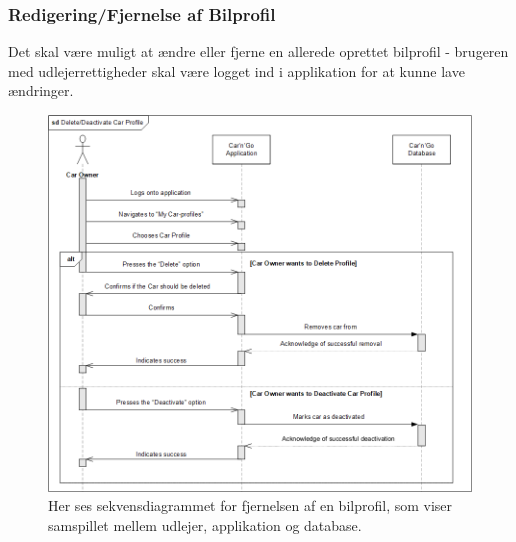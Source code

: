 \documentclass[Arkitektur/System_main.tex]{subfiles}
\begin{document}
\subsubsection{Redigering/Fjernelse af Bilprofil}
Det skal være muligt at ændre eller fjerne en allerede oprettet bilprofil - brugeren med udlejerrettigheder skal være logget ind i applikation for at kunne lave ændringer. 
\begin{figure}[H]
    \centering
    \includegraphics[width=1\textwidth]{Arkitektur/Softwarearkitektur/Car_registration/graphics/DeleteCarProfileSD.png}
    \caption{Her ses sekvensdiagrammet for fjernelsen af en bilprofil, som viser samspillet mellem udlejer, applikation og database. }
    \label{fig:DeleteCarProfileCD}
\end{figure}
\end{document}
